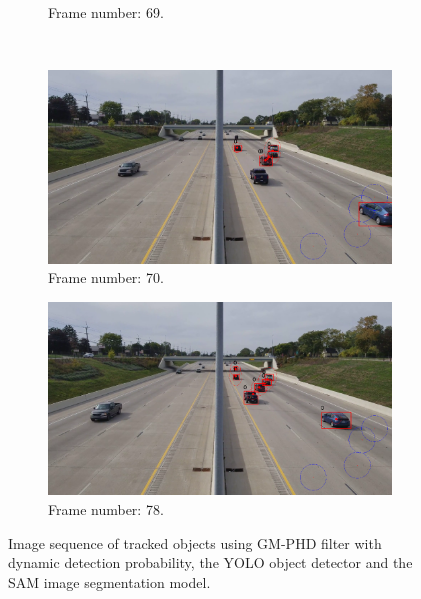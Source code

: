 \begin{figure}[H]
\begin{subfigure}{0.48\textwidth}
        \caption{Frame number: 69.}
        \label{fig:E1-V1-S2:06}
    \end{subfigure}
    \\
    \begin{subfigure}{0.48\textwidth}
        \centering
        \includegraphics[width=\linewidth]{../../../experiments/E1/V1/SAM/70}
        \caption{Frame number: 70.}
        \label{fig:E1-V1-S2:07}
    \end{subfigure}
    \begin{subfigure}{0.48\textwidth}
        \centering
        \includegraphics[width=\linewidth]{../../../experiments/E1/V1/SAM/78}
        \caption{Frame number: 78.}
        \label{fig:E1-V1-S2:08}
    \end{subfigure}
    \caption{Image sequence of tracked objects using GM-PHD filter with dynamic detection probability, the YOLO object detector and the SAM image segmentation model.}
    \label{fig:E1-V1-S2}
\end{figure}


